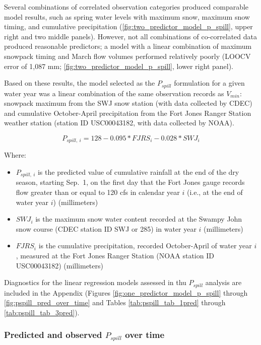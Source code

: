 \documentclass[hess, manuscript]{copernicus}
\providecommand{\tightlist}{%
  \setlength{\itemsep}{0pt}\setlength{\parskip}{0pt}}
\begin{document}
Several combinations of correlated observation categories produced
comparable model results, such as spring water levels with maximum snow,
maximum snow timing, and cumulative precipitation
(\autoref{fig:two_predictor_model_p_spill}, upper right and two middle
panels). However, not all combinations of co-correlated data produced
reasonable predictors; a model with a linear combination of maximum
snowpack timing and March flow volumes performed relatively poorly
(LOOCV error of 1,087 mm; \autoref{fig:two_predictor_model_p_spill},
lower right panel).

Based on these results, the model selected as the \(P_{spill}\)
formulation for a given water year was a linear combination of the same
observation records as \(V_{min}\): snowpack maximum from the SWJ snow
station (with data collected by CDEC) and cumulative October-April
precipitation from the Fort Jones Ranger Station weather station
(station ID USC00043182, with data collected by NOAA).

\begin{equation}
P_{spill,~i} = 128 -0.095 * FJRS_{i} - 0.028* SWJ_{i}
\end{equation}

Where:

\begin{itemize}
\tightlist
\item
  \(P_{spill,~i}\) is the predicted value of cumulative rainfall at the
  end of the dry season, starting Sep.~1, on the first day that the Fort
  Jones gauge records flow greater than or equal to 120 cfs in calendar
  year \(i\) (i.e., at the end of water year \(i\)) (millimeters)
\item
  \(SWJ_{i}\) is the maximum snow water content recorded at the Swampy
  John snow course (CDEC station ID SWJ or 285) in water year \(i\)
  (millimeters)
\item
  \(FJRS_{i}\) is the cumulative precipitation, recorded October-April
  of water year \(i\), measured at the Fort Jones Ranger Station (NOAA
  station ID USC00043182) (millimeters)
\end{itemize}

Diagnostics for the linear regression models assessed in thu
\(P_{spill}\) analysis are included in the Appendix (Figures
\ref{fig:one_predictor_model_p_spill} through
\ref{fig:pspill_pred_over_time} and Tables \ref{tab:pspill_tab_1pred}
through \ref{tab:pspill_tab_3pred}).

\subsubsection{\texorpdfstring{Predicted and observed \(P_{spill}\) over
time}{Predicted and observed P\_\{spill\} over time}}
\end{document}
